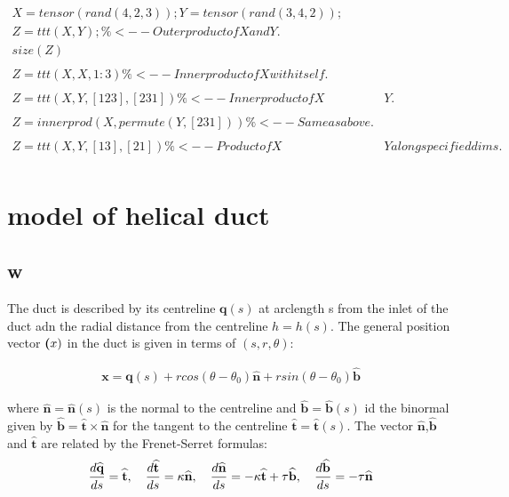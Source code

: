 \documentclass{Note}
\begin{document}
\begin{equation}
\begin{aligned}
X = tensor(rand(4,2,3)); Y = tensor(rand(3,4,2));\\
Z = ttt(X,Y); \%<-- Outer product of X and Y.\\
size(Z)\\
\\
Z = ttt(X,X,1:3) \%<-- Inner product of X with itself.\\
\\
Z = ttt(X,Y,[1 2 3],[2 3 1]) \%<-- Inner product of X & Y.\\
\\
Z = innerprod(X,permute(Y, [2 3 1])) \%<-- Same as above.\\
\\
Z = ttt(X,Y,[1 3],[2 1]) \%<-- Product of X & Y along specified dims.\\
\end{aligned}
\end{equation}


\section{model of helical duct}
\subsection{w}

The duct is described by its centreline $\textbf{q}(s)$ at arclength s from the inlet of the duct adn the radial distance from the centreline $h=h(s)$. The general position vector $\textbf(x)$ in the duct is given in terms of $(s,r,\theta)$:

\begin{equation}
\begin{aligned}
\textbf{x}=\textbf{q}(s)+rcos(\theta-\theta_0) \widehat{\textbf{n}}+rsin(\theta-\theta_0) \widehat{\textbf{b}}
\end{aligned}
\end{equation}

where $\widehat{\textbf{n}}=\widehat{\textbf{n}}(s)$ is the normal to the centreline and $\widehat{\textbf{b}}=\widehat{\textbf{b}}(s)$ id the binormal given by $\widehat{\textbf{b}}=\widehat{\textbf{t}}\times \widehat{\textbf{n}}$ for the tangent to the centreline $\widehat{\textbf{t}}=\widehat{\textbf{t}}(s)$. The vector $\widehat{\textbf{n}}$,$\widehat{\textbf{b}}$ and $\widehat{\textbf{t}}$ are related by the Frenet-Serret formulas:
\begin{equation}
\begin{aligned}
{d\widehat{\textbf{q}}\over ds}=\widehat{\textbf{t}},\quad {d\widehat{\textbf{t}}\over ds}=\kappa \widehat{\textbf{n}},\quad {d\widehat{\textbf{n}}\over ds}=-\kappa \widehat{\textbf{t}}+\tau \widehat{\textbf{b}},\quad {d\widehat{\textbf{b}}\over ds}=-\tau \widehat{\textbf{n}}
\end{aligned}
\end{equation}
\end{document}
